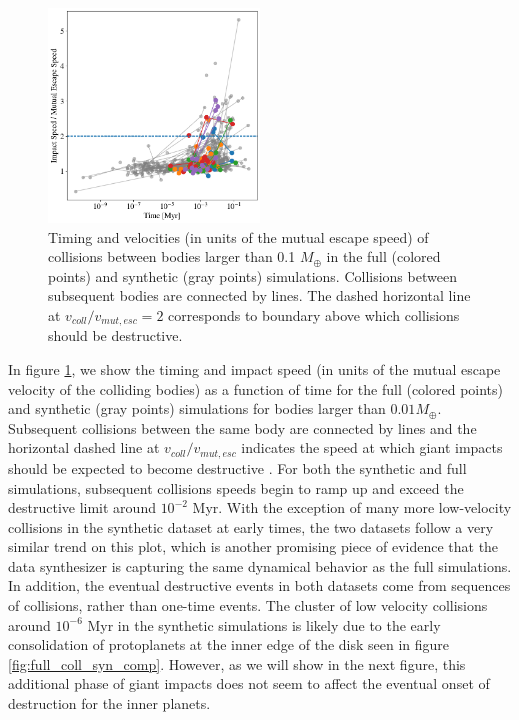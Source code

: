 \begin{figure}
\begin{center}
    \includegraphics[width=0.5\textwidth]{figures/stip/impact_syn_comp.png}
    \caption{Timing and velocities (in units of the mutual escape speed) of collisions between bodies larger than 0.1 $M_{\oplus}$ in the full (colored points) and synthetic (gray points) simulations. Collisions between subsequent bodies are connected by lines. The dashed horizontal line at $v_{coll}/v_{mut,esc} = 2$ corresponds to boundary above which collisions should be destructive.\label{fig:impact_syn_comp}}
\end{center}
\end{figure}

In figure \ref{fig:impact_syn_comp}, we show the timing and impact speed (in units of the mutual escape velocity of the colliding bodies) as a function of time for the full (colored points) and synthetic (gray points) simulations for bodies larger than $0.01 M_{\oplus}$. Subsequent collisions between the same body are connected by lines and the horizontal dashed line at $v_{coll}/v_{mut, esc}$ indicates the speed at which giant impacts should be expected to become destructive \cite{marcus09}. For both the synthetic and full simulations, subsequent collisions speeds begin to ramp up and exceed the destructive limit around $10^{-2}$ Myr. With the exception of many more low-velocity collisions in the synthetic dataset at early times, the two datasets follow a very similar trend on this plot, which is another promising piece of evidence that the data synthesizer is capturing the same dynamical behavior as the full simulations. In addition, the eventual destructive events in both datasets come from sequences of collisions, rather than one-time events. The cluster of low velocity collisions around $10^{-6}$ Myr in the synthetic simulations is likely due to the early consolidation of protoplanets at the inner edge of the disk seen in figure \ref{fig:full_coll_syn_comp}. However, as we will show in the next figure, this additional phase of giant impacts does not seem to affect the eventual onset of destruction for the inner planets.

